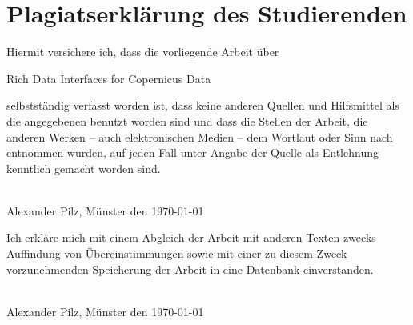 \newpage
\thispagestyle{empty}
\section*{Plagiatserklärung des Studierenden}	

Hiermit versichere ich, dass die vorliegende Arbeit über 

\begin{center}
Rich Data Interfaces for Copernicus Data
\end{center}

selbstständig verfasst worden ist, dass keine anderen 
Quellen und Hilfsmittel als die angegebenen benutzt worden sind und dass die Stellen der 
Arbeit, die anderen Werken – auch elektronischen Medien – dem Wortlaut oder Sinn nach 
entnommen wurden, auf jeden Fall unter Angabe der Quelle als Entlehnung kenntlich gemacht 
worden sind.\\

\vspace{0.75cm}
\parbox{17em}{\hrulefill} \\
Alexander Pilz, Münster den \today

\vspace{0.75cm}

Ich erkläre mich mit einem Abgleich der Arbeit mit anderen Texten zwecks Auffindung von 
Übereinstimmungen sowie mit einer zu diesem Zweck vorzunehmenden Speicherung der Arbeit 
in eine Datenbank einverstanden.\\

\vspace{0.75cm}
\parbox{17em}{\hrulefill} \\
Alexander Pilz, Münster den \today